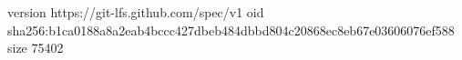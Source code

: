 version https://git-lfs.github.com/spec/v1
oid sha256:b1ca0188a8a2eab4bccc427dbeb484dbbd804c20868ec8eb67e03606076ef588
size 75402
